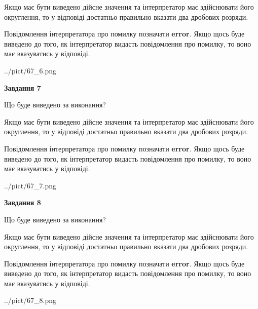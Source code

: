 \documentclass[12pt, ukrainian]{article}
\begin{document}
{\begin {Large}
Якщо має бути виведено дійсне значення та інтерпретатор має здійснювати його округлення, 
то у відповіді достатньо правильно вказати два дробових розряди.

Повідомлення інтерпретатора про помилку позначати \textbf{error}.
Якщо щось буде виведено до того, як інтерпретатор видасть повідомлення про помилку, 
то воно має вказуватись у відповіді. \par

\begin{center}
	{../pict/67_6.png}
\end{center}
\newpage

{\begin {center}\textbf{Завдання 7}\end {center}}\par
Що буде виведено за виконання? \par

Якщо має бути виведено дійсне значення та інтерпретатор має здійснювати його округлення, 
то у відповіді достатньо правильно вказати два дробових розряди.

Повідомлення інтерпретатора про помилку позначати \textbf{error}.
Якщо щось буде виведено до того, як інтерпретатор видасть повідомлення про помилку, 
то воно має вказуватись у відповіді. \par

\begin{center}
	{../pict/67_7.png}
\end{center}
\newpage

{\begin {center}\textbf{Завдання 8}\end {center}}\par
Що буде виведено за виконання? \par

Якщо має бути виведено дійсне значення та інтерпретатор має здійснювати його округлення, 
то у відповіді достатньо правильно вказати два дробових розряди.

Повідомлення інтерпретатора про помилку позначати \textbf{error}.
Якщо щось буде виведено до того, як інтерпретатор видасть повідомлення про помилку, 
то воно має вказуватись у відповіді. \par

\begin{center}
	{../pict/67_8.png}
\end{center}
\newpage


\end{Large}}
\end{document}
